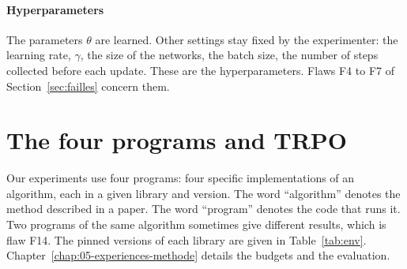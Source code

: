 \paragraph{Hyperparameters}
The parameters $\theta$ are learned. Other settings stay fixed by the experimenter: the learning rate,
$\gamma$, the size of the networks, the batch size, the number of steps collected before each update.
These are the hyperparameters. Flaws F4 to F7 of Section~\ref{sec:failles} concern them.

\section{The four programs and TRPO}\label{sec:ctx-programmes}

Our experiments use four programs: four specific implementations of an algorithm, each in a given
library and version. The word \enquote{algorithm} denotes the method described in a paper. The word
\enquote{program} denotes the code that runs it. Two programs of the same algorithm sometimes give
different results, which is flaw F14. The pinned versions of each library are given in
Table~\ref{tab:env}. Chapter~\ref{chap:05-experiences-methode} details the budgets and the evaluation.

